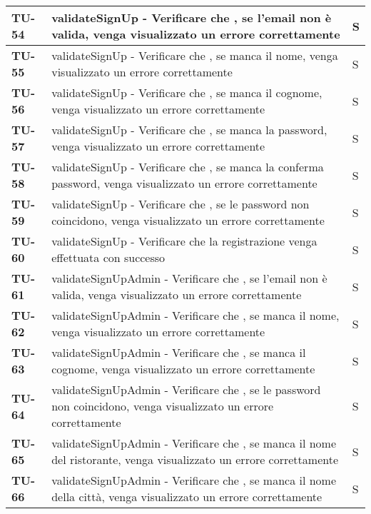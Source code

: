 \begin{longtable}{|>{\centering\arraybackslash}p{1.5cm}|p{15cm}|p{1cm}|}
  \hline
  \rowcolor{gray!10}
  \textbf{TU-54} & validateSignUp - Verificare che , se l'email non è valida, venga visualizzato un errore correttamente  & S \\
  \hline
  \rowcolor{gray!10}
  \textbf{TU-55} & validateSignUp - Verificare che , se manca il nome, venga visualizzato un errore correttamente  & S \\
  \hline
  \rowcolor{gray!10}
  \textbf{TU-56} & validateSignUp - Verificare che , se manca il cognome, venga visualizzato un errore correttamente  & S \\
  \hline
  \rowcolor{gray!10}
  \textbf{TU-57} & validateSignUp - Verificare che , se manca la password, venga visualizzato un errore correttamente  & S \\
  \hline
  \rowcolor{gray!10}
  \textbf{TU-58} & validateSignUp - Verificare che , se manca la conferma password, venga visualizzato un errore correttamente  & S \\
  \hline
  \rowcolor{gray!10}
  \textbf{TU-59} & validateSignUp - Verificare che , se le password non coincidono, venga visualizzato un errore correttamente  & S \\
  \hline
  \rowcolor{gray!10}
  \textbf{TU-60} & validateSignUp - Verificare che la registrazione venga effettuata con successo  & S \\
  \hline
  \rowcolor{gray!10}
  \textbf{TU-61} & validateSignUpAdmin - Verificare che , se l'email non è valida, venga visualizzato un errore correttamente  & S \\
  \hline
  \rowcolor{gray!10}
  \textbf{TU-62} & validateSignUpAdmin - Verificare che , se manca il nome, venga visualizzato un errore correttamente  & S \\
  \hline
  \rowcolor{gray!10}
  \textbf{TU-63} & validateSignUpAdmin - Verificare che , se manca il cognome, venga visualizzato un errore correttamente  & S \\
  \hline
  \rowcolor{gray!10}
  \textbf{TU-64} & validateSignUpAdmin - Verificare che , se le password non coincidono, venga visualizzato un errore correttamente  & S \\
  \hline
  \rowcolor{gray!10}
  \textbf{TU-65} & validateSignUpAdmin - Verificare che , se manca il nome del ristorante, venga visualizzato un errore correttamente  & S \\
  \hline
  \rowcolor{gray!10}
  \textbf{TU-66} & validateSignUpAdmin - Verificare che , se manca il nome della città, venga visualizzato un errore correttamente  & S \\

\end{longtable}
